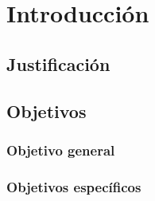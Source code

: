 \chapter{Introducción}

	\section{Justificación}
	
	\section{Objetivos}
	
		\subsection{Objetivo general}
		
		\subsection{Objetivos específicos}
	